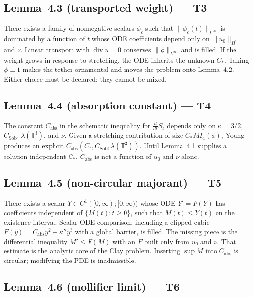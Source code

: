 \documentclass[11pt]{article}
\theoremstyle{plain}
\theoremstyle{definition}
\theoremstyle{remark}
\newcommand{\Tthree}{\mathbb{T}^{3}}
\begin{document}
\subsection{Lemma~4.3 (transported weight) --- T3}

There exists a family of nonnegative scalars \(\phi_{\varepsilon}\) such that \(\|\phi_{\varepsilon}(t)\|_{L^{\infty}}\) is dominated by a function of \(t\) whose ODE coefficients depend only on \(\|u_{0}\|_{H^{s}}\) and \(\nu\). Linear transport with \(\operatorname{div}u=0\) conserves \(\|\phi\|_{L^{\infty}}\) and is filled. If the weight grows in response to stretching, the ODE inherits the unknown \(C_{\ast}\). Taking \(\phi\equiv 1\) makes the tether ornamental and moves the problem onto Lemma~4.2. Either choice must be declared; they cannot be mixed.

\subsection{Lemma~4.4 (absorption constant) --- T4}

The constant \(C_{\mathrm{abs}}\) in the schematic inequality for \(\frac{d}{dt}S_{\varepsilon}\) depends only on \(\kappa=3/2\), \(C_{\mathrm{Sob}}\), \(\lambda(\Tthree)\), and \(\nu\). Given a stretching contribution of size \(C_{\ast}MI_{4}(\phi)\), Young produces an explicit \(C_{\mathrm{abs}}(C_{\ast},C_{\mathrm{Sob}},\lambda(\Tthree))\). Until Lemma~4.1 supplies a solution-independent \(C_{\ast}\), \(C_{\mathrm{abs}}\) is not a function of \(u_{0}\) and \(\nu\) alone.

\subsection{Lemma~4.5 (non-circular majorant) --- T5}

There exists a scalar \(Y\in C^{1}([0,\infty);[0,\infty))\) whose ODE \(Y'=F(Y)\) has coefficients independent of \(\{M(t):t\ge 0\}\), such that \(M(t)\le Y(t)\) on the existence interval. Scalar ODE comparison, including a clipped cubic \(F(y)=C_{\mathrm{abs}}y^{2}-\kappa'' y^{3}\) with a global barrier, is filled. The missing piece is the differential inequality \(M'\le F(M)\) with an \(F\) built only from \(u_{0}\) and \(\nu\). That estimate is the analytic core of the Clay problem. Inserting \(\sup M\) into \(C_{\mathrm{abs}}\) is circular; modifying the PDE is inadmissible.

\subsection{Lemma~4.6 (mollifier limit) --- T6}
\end{document}
